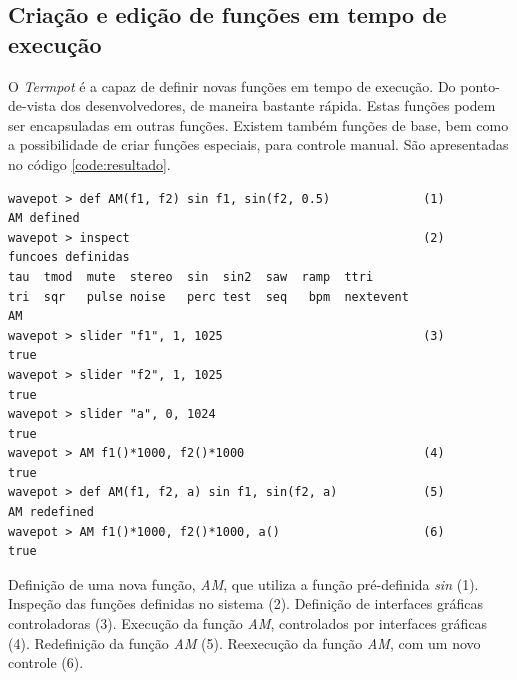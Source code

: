 \subsection*{Criação e edição de funções em tempo de execução}

O \emph{Termpot} é a capaz de definir novas funções em tempo de execução. Do ponto-de-vista dos desenvolvedores, de maneira bastante rápida. Estas funções  podem ser encapsuladas em outras funções. Existem também funções de base, bem como a possibilidade de criar funções especiais, para controle manual. São apresentadas no código \ref{code:resultado}.

\begin{listing}
\begin{verbatim}
wavepot > def AM(f1, f2) sin f1, sin(f2, 0.5)             (1)
AM defined
wavepot > inspect                                         (2)
funcoes definidas 
tau  tmod  mute  stereo  sin  sin2  saw  ramp  ttri
tri  sqr   pulse noise	 perc test  seq   bpm  nextevent
AM
wavepot > slider "f1", 1, 1025                            (3)
true
wavepot > slider "f2", 1, 1025
true
wavepot > slider "a", 0, 1024            
true
wavepot > AM f1()*1000, f2()*1000                         (4)
true
wavepot > def AM(f1, f2, a) sin f1, sin(f2, a)            (5)
AM redefined
wavepot > AM f1()*1000, f2()*1000, a()                    (6)
true
\end{verbatim}
\label{code:resultado2}
\caption{Definição de uma nova função, \emph{AM}, que utiliza a função pré-definida \emph{sin} (1). Inspeção das funções definidas no sistema (2). Definição de interfaces gráficas controladoras (3). Execução da função \emph{AM}, controlados por interfaces gráficas (4). Redefinição da função \emph{AM} (5). Reexecução da função \emph{AM}, com um novo controle (6). }
\end{listing}

